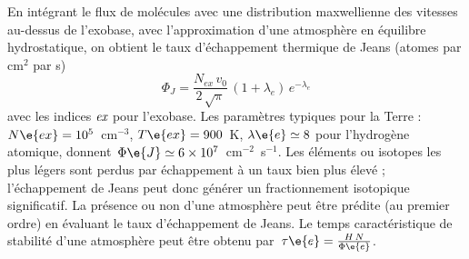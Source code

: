 \sk
En intégrant le flux de molécules avec une distribution
maxwellienne des vitesses au-dessus de l'exobase,
avec l'approximation d'une atmosphère en équilibre hydrostatique,
on obtient le taux d'échappement thermique de Jeans (atomes par cm$^2$ par s)
\[ \Phi_J = \frac{N_{ex} \, v_0}{2\,\sqrt{\pi}} \, (1+\lambda_e) \, e^{-\lambda_e} \]
\noindent avec les indices $\emph{ex}$ pour l'exobase. Les paramètres typiques pour la Terre : $N\e{ex} = 10^5$~cm$^{-3}$, $T\e{ex} = 900$~K, $\lambda\e{e} \simeq 8$ pour l'hydrogène atomique, donnent~$\Phi\e{J} \simeq 6 \times 10^7$~cm$^{-2}$~s$^{-1}$.
%
Les éléments ou isotopes les plus légers sont perdus par échappement
à un taux bien plus élevé ; l'échappement de Jeans peut donc
générer un fractionnement isotopique significatif.
La présence ou non d'une atmosphère peut être prédite (au premier ordre)
en évaluant le taux d'échappement de Jeans.
Le temps caractéristique de stabilité d'une atmosphère peut
être obtenu par~$\tau\e{e} = \frac{H \, N}{\Phi\e{e}}$.
























